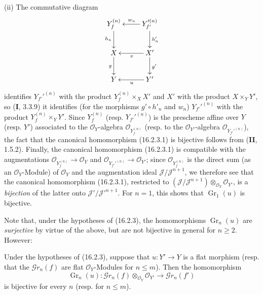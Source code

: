 \noindent(ii) The commutative diagram
\[
  \xymatrix{
    Y_f^{(n)} \ar[d]_{h_n}
      & Y_{f'}'^{(n)} \ar[d]^-{h'_n} \ar[l]_{w_n} \\
    X \ar[d]_g
      & X' \ar[d]^{g'} \ar[l]^v \\
    Y
      & Y' \ar[l]^u
  }
\]
identifies $Y_{f'}'^{(n)}$ with the product $Y_f^{(n)}\times_X X'$ and $X'$ with the product
$X\times_Y Y'$, so (\textbf{I}, 3.3.9) it identifies (for the morphisms
$g'\circ h'_n$ and $w_n$) $Y_{f'}'^{(n)}$ with the product
$Y_f^{(n)}\times_Y Y'$. Since $Y_f^{(n)}$ (resp. $Y_{f'}'^{(n)}$) is the
prescheme affine over $Y$ (resp. $Y'$) associated to the
$\mathcal{O}_Y$-algebra $\mathcal{O}_{Y_f^{(n)}}$ (resp. to the
$\mathcal{O}_{Y'}$-algebra $\mathcal{O}_{Y_{f'}'^{(n)}}$), the fact that
the canonical homomorphism (16.2.3.1) is bijective follows from (\textbf{II}, 1.5.2).
Finally, the canonical homomorphism (16.2.3.1) is compatible with the
augmentations
$\mathcal{O}_{Y_f^{(n)}}\to\mathcal{O}_Y$ and
$\mathcal{O}_{Y_{f'}'^{(n)}}\to\mathcal{O}_{Y'}$; since
$\mathcal{O}_{Y_f^{(n)}}$ is the direct sum (as an
$\mathcal{O}_Y$-Module) of $\mathcal{O}_Y$ and the augmentation ideal
$\mathscr{J}/\mathscr{J}^{n+1}$, we therefore see that the canonical homomorphism
(16.2.3.1), restricted to
$(\mathscr{J}/\mathscr{J}^{n+1})\otimes_{\mathcal{O}_Y}\mathcal{O}_{Y'}$,
is a \emph{bijection} of the latter onto
$\mathscr{J}'/\mathscr{J}'^{n+1}$. For $n=1$, this shows that
$\operatorname{Gr}_1(u)$ is bijective.

Note that, under the hypotheses of (16.2.3), the homomorphisms
$\operatorname{Gr}_n(u)$ are \emph{surjective} by virtue of the above, but are
not bijective in general for $n\geq 2$. However:

\begin{corollary}[16.2.4]
\label{IV.16.2.4}
Under the hypotheses of (16.2.3), suppose that $u:Y'\to Y$ is a flat
morphism \textup{(resp.} that the $\mathscr{G}r_n(f)$ are flat $\mathcal{O}_Y$-Modules
for $n\leq m$\textup{)}. Then the homomorphism
\[
  \operatorname{Gr}_n(u):
  \mathscr{G}r_n(f)\otimes_{\mathcal{O}_Y}\mathcal{O}_{Y'}
  \longrightarrow\mathscr{G}r_n(f')
\]
is bijective for every $n$ \textup{(resp.} for $n\leq m$\textup{)}.
\end{corollary}

